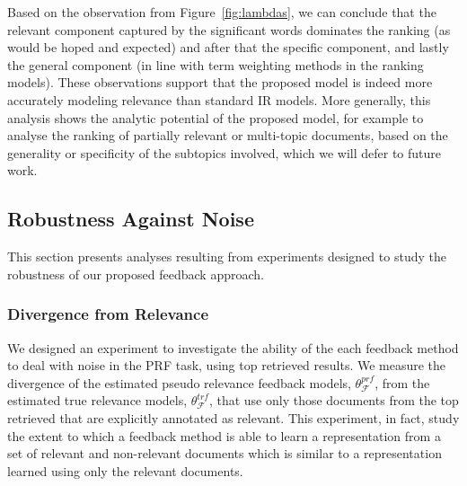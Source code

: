 Based on the observation from Figure~\ref{fig:lambdas}, we can conclude that the relevant component captured by the significant words dominates the ranking (as would be hoped and expected) and after that the specific component, and lastly the general component (in line with term weighting methods in the ranking models). These observations support that the proposed model is indeed more accurately modeling relevance than standard IR models.
More generally, this analysis shows the analytic potential of the proposed model, for example to analyse the ranking of partially relevant or multi-topic documents, based on the generality or specificity of the subtopics involved, which we will defer to future work.


\subsection{Robustness Against Noise}
\label{sec:robustness}
This section presents analyses resulting from experiments designed to study the robustness of our proposed feedback approach.


\subsubsection{Divergence from Relevance}
\label{sec:DfR}
We designed an experiment to investigate the ability of the each feedback method to deal with noise in the PRF task, using top retrieved results. We measure the divergence of the estimated pseudo relevance feedback models, $\theta_{\mathcal{F}}^{prf}$, from the estimated true relevance models, $\theta_{\mathcal{F}}^{trf}$, that use only those documents from the top retrieved that are explicitly annotated as relevant.
%
This experiment, in fact, study the extent to which a feedback method is able to learn a representation from a set of relevant and non-relevant documents which is similar to a representation learned using only the relevant documents.


